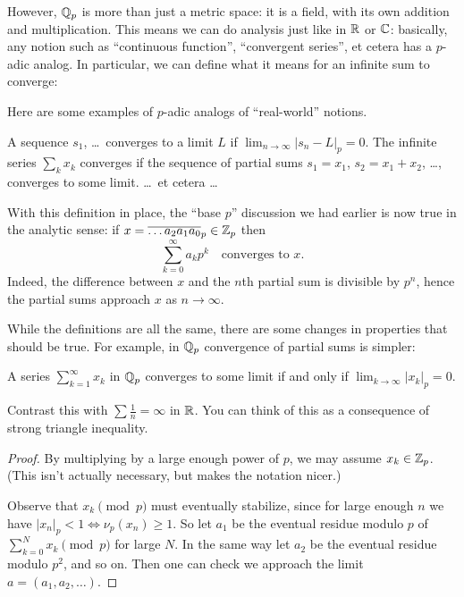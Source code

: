 However, $\mathbb Q_p$ is more than just a metric space:
it is a field, with its own addition and multiplication.
This means we can do analysis just like in $\mathbb R$ or $\mathbb C$:
basically, any notion such as ``continuous function'',
``convergent series'', et cetera has a $p$-adic analog.
In particular, we can define what it means for an infinite sum to converge:
\begin{definition}
	Here are some examples of $p$-adic analogs of ``real-world'' notions.
	\begin{itemize}
		\ii A sequence $s_1$, \dots\ converges to a limit $L$
		if $\lim_{n \to \infty} \left\lvert s_n - L \right\rvert_p = 0$.
		\ii The infinite series $\sum_k x_k$ converges
		if the sequence of partial sums $s_1 = x_1$,
		$s_2 = x_1 + x_2$, \dots, converges to some limit.
		\ii \dots\ et cetera \dots
	\end{itemize}
\end{definition}
With this definition in place,
the ``base $p$'' discussion we had earlier is now true
in the analytic sense: if $x = \overline{\dots a_2 a_1 a_0}_p \in \mathbb Z_p$ then
\[ \sum_{k=0}^\infty a_k p^k \quad\text{converges to } x. \]
Indeed, the difference between $x$ and the $n$th partial sum is divisible by $p^n$,
hence the partial sums approach $x$ as $n \to \infty$.

While the definitions are all the same,
there are some changes in properties that should be true.
For example, in $\mathbb Q_p$ convergence of partial sums is simpler:
\begin{proposition}
	A series $\sum_{k=1}^\infty x_k$ in $\mathbb Q_p$
	converges to some limit if and only if
	$\lim_{k \to \infty} |x_k|_p = 0$.
	\label{noharmonic}
\end{proposition}
Contrast this with $\sum \frac1n = \infty$ in $\mathbb R$.
You can think of this as a consequence of strong triangle inequality.
\begin{proof}
	By multiplying by a large enough power of $p$,
	we may assume $x_k \in \mathbb Z_p$.
	(This isn't actually necessary, but makes the notation nicer.)

	Observe that $x_k \pmod p$ must eventually stabilize,
	since for large enough $n$ we have
	$\left\lvert x_n \right\rvert_p < 1 \iff \nu_p(x_n) \ge 1$.
	So let $a_1$ be the eventual residue modulo $p$
	of $\sum_{k=0}^N x_k \pmod p$ for large $N$.
	In the same way let $a_2$ be the eventual residue modulo $p^2$, and so on.
	Then one can check we approach the limit $a = (a_1, a_2, \dots)$.
\end{proof}

